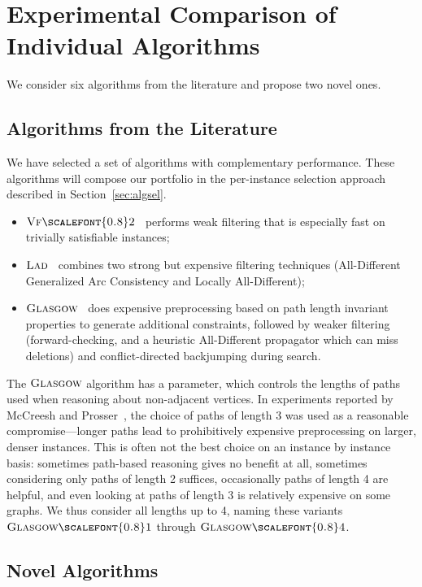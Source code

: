 \documentclass{llncs}
\newcommand{\VFtwo}{$\textsc{Vf{\scalefont{0.8}2}}$\xspace}
\newcommand{\Glasgow}{$\textsc{Glasgow}$\xspace}
\newcommand{\LAD}{$\textsc{Lad}$\xspace}
\newcommand{\GlasgowOne}{$\textsc{Glasgow{\scalefont{0.8}1}}$\xspace}
\newcommand{\GlasgowFour}{$\textsc{Glasgow{\scalefont{0.8}4}}$\xspace}
\begin{document}
\section{Experimental Comparison of Individual Algorithms}\label{sec:exps}

We consider six algorithms from the literature and propose two novel ones.

\subsection{Algorithms from the Literature}

We have selected a set of algorithms with complementary performance. These
algorithms will compose our portfolio in the per-instance selection approach
described in Section~\ref{sec:algsel}.
\begin{itemize}
\item \VFtwo{}~\cite{Cordella:2004} performs weak filtering that is especially fast on
    trivially satisfiable instances;
\item \LAD{}~\cite{Solnon:2010} combines two strong but expensive filtering techniques
    (All-Different Generalized Arc Consistency and Locally All-Different);
\item \Glasgow{}~\cite{McCreesh:2015} does expensive preprocessing based on path length
    invariant properties to generate additional constraints, followed by weaker filtering
    (forward-checking, and a heuristic All-Different propagator which can miss deletions) and
    conflict-directed backjumping during search.
\end{itemize}

\noindent The \Glasgow algorithm has a parameter, which controls the lengths of paths used when
reasoning about non-adjacent vertices.  In experiments reported by McCreesh and
Prosser~\cite{McCreesh:2015}, the choice of paths of length 3 was used as a reasonable compromise---longer
paths lead to prohibitively expensive preprocessing on larger, denser instances. This is often not
the best choice on an instance by instance basis: sometimes path-based reasoning gives no benefit at
all, sometimes considering only paths of length 2 suffices, occasionally paths of length 4 are
helpful, and even looking at paths of length 3 is relatively expensive on some graphs. We thus consider all
lengths up to 4, naming these variants \GlasgowOne through \GlasgowFour.

\subsection{Novel Algorithms}
\end{document}

